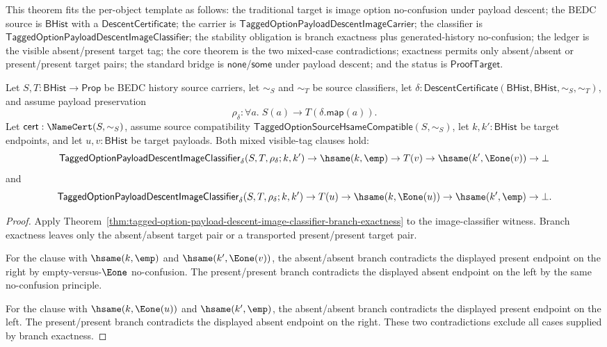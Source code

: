 \begin{theorem}
\label{thm:tagged-option-payload-descent-image-classifier-mixed-visible-tag-separation}
This theorem fits the per-object template as follows: the traditional target is
image option no-confusion under payload descent; the BEDC source is
$\mathsf{BHist}$ with a $\mathsf{DescentCertificate}$; the carrier is
$\mathsf{TaggedOptionPayloadDescentImageCarrier}$; the classifier is
$\mathsf{TaggedOptionPayloadDescentImageClassifier}$; the stability obligation is
branch exactness plus generated-history no-confusion; the ledger is the visible
absent/present target tag; the core theorem is the two mixed-case
contradictions; exactness permits only absent/absent or present/present target
pairs; the standard bridge is $\mathsf{none}$/$\mathsf{some}$ under payload
descent; and the status is $\mathsf{ProofTarget}$.

Let $S,T:\mathsf{BHist}\to\mathsf{Prop}$ be BEDC history source carriers, let
$\sim_S$ and $\sim_T$ be source classifiers, let
$\delta:\mathsf{DescentCertificate}(\mathsf{BHist},\mathsf{BHist},\sim_S,\sim_T)$,
and assume payload preservation
$$
\rho_{\delta}:\forall a.\;S(a)\to T(\delta.\mathsf{map}(a)).
$$
Let $\mathsf{cert}:\NameCert(S,\sim_S)$, assume source compatibility
$\mathsf{TaggedOptionSourceHsameCompatible}(S,\sim_S)$, let
$k,k':\mathsf{BHist}$ be target endpoints, and let $u,v:\mathsf{BHist}$ be
target payloads. Both mixed visible-tag clauses hold:
$$
\mathsf{TaggedOptionPayloadDescentImageClassifier}_{\delta}
(S,T,\rho_{\delta};k,k')\to
\hsame(k,\emp)\to T(v)\to \hsame(k',\Eone(v))\to\bot
$$
and
$$
\mathsf{TaggedOptionPayloadDescentImageClassifier}_{\delta}
(S,T,\rho_{\delta};k,k')\to
T(u)\to \hsame(k,\Eone(u))\to \hsame(k',\emp)\to\bot.
$$
\end{theorem}
\begin{proof}
Apply Theorem~\ref{thm:tagged-option-payload-descent-image-classifier-branch-exactness}
to the image-classifier witness. Branch exactness leaves only the absent/absent
target pair or a transported present/present target pair.

For the clause with $\hsame(k,\emp)$ and $\hsame(k',\Eone(v))$, the
absent/absent branch contradicts the displayed present endpoint on the right by
empty-versus-$\Eone$ no-confusion. The present/present branch contradicts the
displayed absent endpoint on the left by the same no-confusion principle.

For the clause with $\hsame(k,\Eone(u))$ and $\hsame(k',\emp)$, the
absent/absent branch contradicts the displayed present endpoint on the left.
The present/present branch contradicts the displayed absent endpoint on the
right. These two contradictions exclude all cases supplied by branch exactness.
\end{proof}
